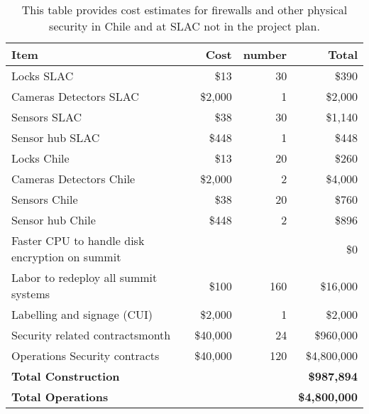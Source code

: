 \tiny \begin{longtable} {|p{}|r|r|r|} \caption{This table provides cost estimates for firewalls and other physical security in Chile and at SLAC not in the project plan. \label{tab:firewalls}}\\ 
\hline 
\textbf{Item}&\textbf{Cost}&\textbf{number}&\textbf{Total} \\ \hline
{Locks SLAC}&{\$13}&{30}&{\$390} \\ \hline
{Cameras Detectors  SLAC}&{\$2,000}&{1}&{\$2,000} \\ \hline
{Sensors SLAC}&{\$38}&{30}&{\$1,140} \\ \hline
{Sensor hub SLAC}&{\$448}&{1}&{\$448} \\ \hline
{Locks Chile}&{\$13}&{20}&{\$260} \\ \hline
{Cameras Detectors Chile}&{\$2,000}&{2}&{\$4,000} \\ \hline
{Sensors Chile}&{\$38}&{20}&{\$760} \\ \hline
{Sensor hub Chile}&{\$448}&{2}&{\$896} \\ \hline
{Faster CPU to handle disk encryption on summit}&{}&{}&{\$0} \\ \hline
{Labor to redeploy all summit systems}&{\$100}&{160}&{\$16,000} \\ \hline
{Labelling and signage (CUI)}&{\$2,000}&{1}&{\$2,000} \\ \hline
{Security related contracts\/month}&{\$40,000}&{24}&{\$960,000} \\ \hline
{Operations Security contracts}&{\$40,000}&{120}&{\$4,800,000} \\ \hline
\textbf{Total Construction}&\textbf{}&\textbf{}&\textbf{\$987,894} \\ \hline
\textbf{Total Operations}&\textbf{}&\textbf{}&\textbf{\$4,800,000} \\ \hline
\end{longtable} \normalsize
